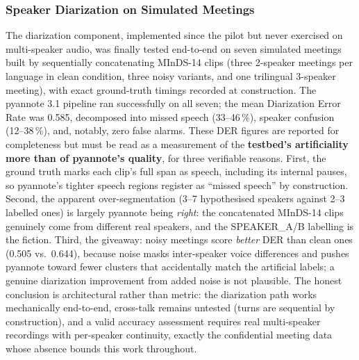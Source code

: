 \documentclass[12pt]{report}
\begin{document}
\subsubsection{Speaker Diarization on Simulated Meetings}
The diarization component, implemented since the pilot but never exercised on multi-speaker audio, was finally tested end-to-end on seven simulated meetings built by sequentially concatenating MInDS-14 clips (three 2-speaker meetings per language in clean condition, three noisy variants, and one trilingual 3-speaker meeting), with exact ground-truth timings recorded at construction. The pyannote 3.1 pipeline ran successfully on all seven; the mean Diarization Error Rate was 0.585, decomposed into missed speech (33--46\,\%), speaker confusion (12--38\,\%), and, notably, zero false alarms.
These DER figures are reported for completeness but must be read as a measurement of the \textbf{testbed's artificiality more than of pyannote's quality}, for three verifiable reasons. First, the ground truth marks each clip's full span as speech, including its internal pauses, so pyannote's tighter speech regions register as \enquote{missed speech} by construction. Second, the apparent over-segmentation (3--7 hypothesised speakers against 2--3 labelled ones) is largely pyannote being \emph{right}: the concatenated MInDS-14 clips genuinely come from different real speakers, and the SPEAKER\_A/B labelling is the fiction. Third, the giveaway: noisy meetings score \emph{better} DER than clean ones (0.505 vs.\ 0.644), because noise masks inter-speaker voice differences and pushes pyannote toward fewer clusters that accidentally match the artificial labels; a genuine diarization improvement from added noise is not plausible. The honest conclusion is architectural rather than metric: the diarization path works mechanically end-to-end, cross-talk remains untested (turns are sequential by construction), and a valid accuracy assessment requires real multi-speaker recordings with per-speaker continuity, exactly the confidential meeting data whose absence bounds this work throughout.
\end{document}
